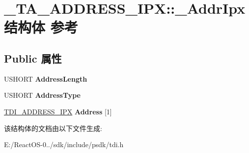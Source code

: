 \hypertarget{struct___t_a___a_d_d_r_e_s_s___i_p_x_1_1___addr_ipx}{}\section{\+\_\+\+T\+A\+\_\+\+A\+D\+D\+R\+E\+S\+S\+\_\+\+I\+PX\+:\+:\+\_\+\+Addr\+Ipx结构体 参考}
\label{struct___t_a___a_d_d_r_e_s_s___i_p_x_1_1___addr_ipx}
\subsection*{Public 属性}
\begin{DoxyCompactItemize}
\item 
\mbox{\label{struct___t_a___a_d_d_r_e_s_s___i_p_x_1_1___addr_ipx_a709ab1c5514c31c6f470a3431d136558}} 
U\+S\+H\+O\+RT {\bfseries Address\+Length}
\item 
\mbox{\label{struct___t_a___a_d_d_r_e_s_s___i_p_x_1_1___addr_ipx_a6110cd1257f592bee0e10801d87d50a6}} 
U\+S\+H\+O\+RT {\bfseries Address\+Type}
\item 
\mbox{\label{struct___t_a___a_d_d_r_e_s_s___i_p_x_1_1___addr_ipx_a82481ba10e3f93c22ec55a7936105685}} 
\hyperlink{struct___t_d_i___a_d_d_r_e_s_s___i_p_x}{T\+D\+I\+\_\+\+A\+D\+D\+R\+E\+S\+S\+\_\+\+I\+PX} {\bfseries Address} \mbox{[}1\mbox{]}
\end{DoxyCompactItemize}


该结构体的文档由以下文件生成\+:\begin{DoxyCompactItemize}
\item 
E\+:/\+React\+O\+S-\/0../sdk/include/psdk/tdi.\+h\end{DoxyCompactItemize}
